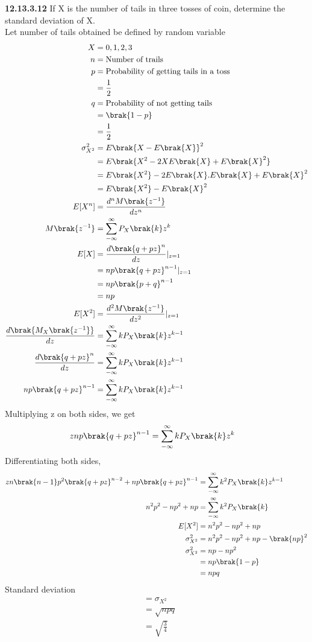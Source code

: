 \documentclass[journal,12pt,twocolumn]{IEEEtran}
\theoremstyle{remark}
\begin{document}
\textbf{12.13.3.12}
If X is the number of tails in three tosses of  coin, determine the standard deviation of X. \\
\solution Let number of tails obtained be defined by random variable
\begin{align}
X&= 0, 1 , 2 ,3 \\
n&=\text{Number of trails} \\
p&=\text{Probability of getting tails in a toss}\\
&=\frac{1}{2}\\
q&=\text{Probability of not getting tails}\\
&=\brak{1-p}\\
&=\frac{1}{2}\\
\sigma_{X^2}^2&=E\brak{X-E\brak{X}}^2\\
&= E\brak{X^2-2XE\brak{X}+E\brak{X}^2}\\
&=E\brak{X^2} -2E\brak{X}.E\brak{X}+ E\brak{X}^2 \\
&=E\brak{X^2} -E\brak{X}^2 \\
E[X^n]&=\frac{d^n M\brak{z^{-1}}}{dz^n}\\
M\brak{z^{-1}}&=\sum\limits^{\infty}_{-\infty}P_X\brak{k}z^k\\
E[X]&=\frac{d\brak{q+pz}^n}{dz}\vert _{z=1}\\
&=np\brak{q+pz}^{n-1} \vert _{z=1}\\
&=np\brak{p+q}^{n-1}\\
&=np\\
E[X^2]&=\frac{d^2 M\brak{z^{-1}}}{dz^2}\vert _{z=1}\\
\frac{d\brak{M_X\brak{z^{-1}}}}{dz}&= \sum\limits^{\infty}_{-\infty}kP_X\brak{k}z^{k-1}\\
\frac{d\brak{q+pz}^n}{dz}&= \sum\limits^{\infty}_{-\infty}kP_X\brak{k}z^{k-1}\\
np\brak{q+pz}^{n-1}&= \sum\limits^{\infty}_{-\infty}kP_X\brak{k}z^{k-1}\\
\end{align}
Multiplying z on both sides, we get
\begin{align}
znp\brak{q+pz}^{n-1}&= \sum\limits^{\infty}_{-\infty}kP_X\brak{k}z^k
\end{align}
Differentiating both sides,
\begin{align}
zn\brak{n-1}p^2\brak{q+pz}^{n-2}+np\brak{q+pz}^{n-1}&= \sum\limits^{\infty}_{-\infty}k^2 P_X\brak{k}z^{k-1}\\
n^2p^2-np^2+np&=\sum\limits^{\infty}_{-\infty}k^2 P_X\brak{k}\\
E[X^2]&=n^2p^2-np^2+np\\
\sigma_{X^2}^2&=n^2p^2-np^2+np-\brak{np}^2\\
\sigma_{X^2}^2&=np-np^2\\
&=np\brak{1-p}\\
&=npq\\
\end{align}
Standard deviation
\begin{align}
&=\sigma_{X^2} \\
&=\sqrt{npq}\\
&=\sqrt{\frac{3}{4}}
\end{align}
\end{document}
